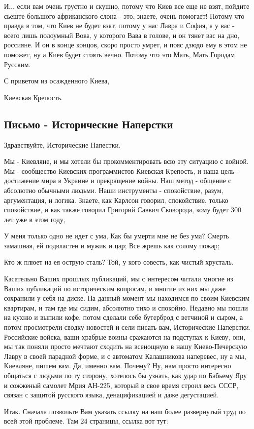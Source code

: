 И... если вам очень грустно и скушно, потому что Киев все еще не взят, пойдите
сьеште большого африканского слона - это, знаете, очень помогает! Потому что
правда в том, что Киев не будет взят, потому у нас Лавра и София, а у вас -
всего лишь полоумный Вова,  у которого Вава в голове,  и он тянет вас на дно,
россияне. И он в конце концов, скоро просто умрет, и пояс дзюдо ему в этом не
поможет, ну а Киев будет стоять вечно. Потому что это Мать, Мать Городам
Русским.

С приветом из осажденного Киева,

Киевская Крепость.

\subsection{Письмо - Исторические Наперстки}

Здравствуйте, Исторические Напестки.

Мы - Киевляне, и мы хотели бы прокомментировать всю эту ситуацию с войной.  Мы
- сообщество Киевских программистов Киевская Крепость, и наша цель - достижение
мира в Украине и прекращение войны.  Наш метод - общение с абсолютно обычными
людьми. Наши инструменты - спокойствие, разум, аргументация, и логика. Знаете,
как Карлсон говорил, спокойствие, только спокойствие, и как также говорил
Григорий Саввич Сковорода, кому будет 300 лет уже в этом году,

У меня только одно не идет с ума,
Как бы умерти мне не без ума?
Смерть замашная, ей подвластен и мужик и цар;
Все жрешь как солому пожар;

Кто ж плюет на ея острую сталь?
Той, у кого совесть, как чистый хрусталь.

Касательно Ваших прошлых публикаций, мы с интересом читали многие из Ваших
публикаций по историческим вопросам, и многие из них мы даже сохранили у себя
на диске. На данный момент мы находимся по своим Киевским квартирам, и там где
мы сидим, абсолютно тихо и спокойно. Недавно мы пошли на кухню и выпили кофе,
потом сделали себе бутерброд с ветчиной и сыром, а потом просмотрели сводку
новостей и сели писать вам, Исторические Наперстки. Российские войска, ваши
храбрые воины сражаются на подступах к Киеву, они, мы так поняли просто мечтают
сходить на всенощную в нашу Киево-Печерскую Лавру в своей парадной форме, и с
автоматом Калашникова наперевес, ну а мы, Киевляне, пишем вам. Да, именно вам.
Почему?  Ну, нам просто интересно общаться с людьми по ту сторону, хотелось бы
узнать, как удар по Бабьему Яру и сожженый самолет Мрия АН-225, который в свое
время строил весь СССР, связан с защитой русского языка, денацификацией и даже
дегустацией.

Итак. Сначала позвольте Вам указать ссылку на наш более развернутый труд по
всей этой проблеме. Там 24 страницы, ссылка вот тут:



